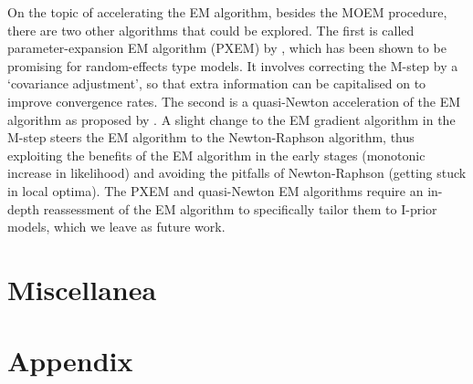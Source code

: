 \documentclass[a4paper,showframe,11pt]{report}
\begin{document}
On the topic of accelerating the EM algorithm, besides the MOEM procedure, there are two other algorithms that could be explored.
The first is called parameter-expansion EM algorithm (PXEM) by \citep{liu1998parameter}, which has been shown to be promising for random-effects type models.
It involves correcting the M-step by a `covariance adjustment', so that extra information can be capitalised on to improve convergence rates.
The second is a quasi-Newton acceleration of the EM algorithm as proposed by \citet{lange1995quasi}.
A slight change to the EM gradient algorithm in the M-step steers the EM algorithm to the Newton-Raphson algorithm, thus exploiting the benefits of the EM algorithm in the early stages (monotonic increase in likelihood) and avoiding the pitfalls of Newton-Raphson (getting stuck in local optima).
The PXEM and quasi-Newton EM algorithms require an in-depth reassessment of the EM algorithm to specifically tailor them to I-prior models, which we leave as future work.

\section*{Miscellanea}


\ifstandalone
  \section*{Appendix}
  
  
  
\fi

\hClosingStuffStandalone
\end{document}

